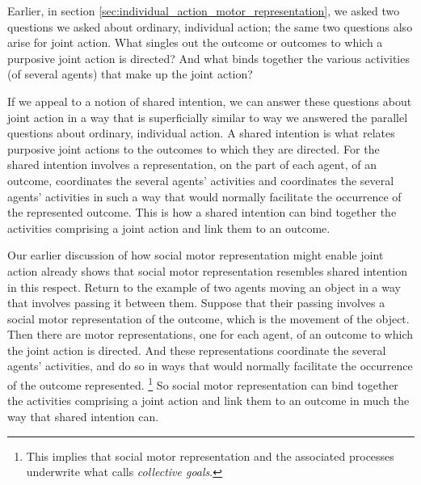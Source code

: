 \documentclass[12pt,\papersize]{extarticle}
\begin{document}
Earlier, in section \vref{sec:individual_action_motor_representation}, we asked two questions we asked about ordinary, individual action; the same two questions also arise for joint action.
What singles out the outcome or outcomes to which a purposive joint action is directed?
And what binds together the various activities (of several agents) that make up the joint action?

If we appeal to a notion of shared intention,
we can answer these questions about joint action in a way that is superficially similar to way we answered the parallel questions about ordinary, individual action.
A shared intention is what relates purposive joint actions to the outcomes to which they are directed.
For the shared intention 
involves a representation, on the part of each agent, of an outcome,
coordinates the several agents’ activities
and 
coordinates the several agents’ activities in such a way that would normally facilitate the occurrence of the represented outcome.
This is how a shared intention can bind together the activities comprising a joint action and link them to an outcome.


Our earlier discussion of how social motor representation might enable joint action already shows that social motor representation resembles shared intention in this respect.
Return to the example of two agents moving an object in a way that involves passing it between them.
Suppose that their passing involves a social motor representation of the outcome,
which is the movement of the object. 
Then there are motor representations, one for each agent, 
of an outcome to which the joint action is directed.
And these representations coordinate the several agents' activities,
and 
do so in ways that would normally facilitate the occurrence of the  outcome represented.%
\footnote{
This implies that social motor representation and the associated processes underwrite what \citet{Butterfill:2011_wija} calls \textit{collective goals}.
}
So social motor representation can bind together the activities comprising a joint action and link them to an outcome in much the way that shared intention can.
\end{document}
